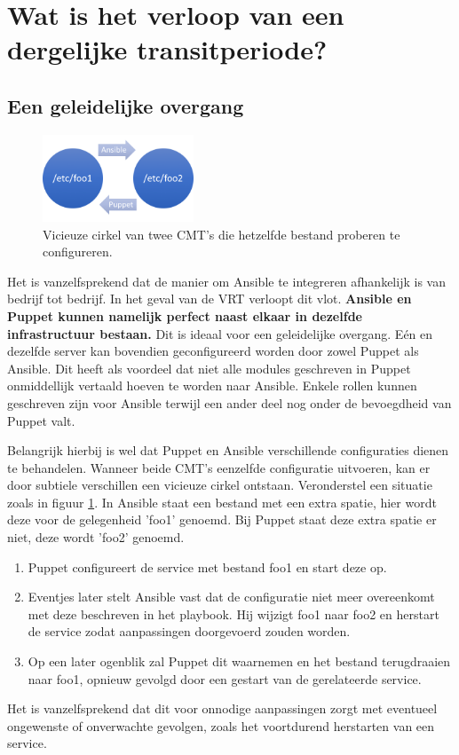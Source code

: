 \section{Wat is het verloop van een dergelijke transitperiode?}
\label{sec:methodologie-verloop-transit}
\subsection{Een geleidelijke overgang}


\begin{figure}
\centering
\includegraphics[width=0.4\textwidth]{img/vicieuzecirkel.PNG}
\caption{\label{fig:vicieuzecirkel}Vicieuze cirkel van twee \gls{CMT}'s die hetzelfde bestand proberen te configureren.}
\end{figure}

Het is vanzelfsprekend dat de manier om Ansible te integreren afhankelijk is van bedrijf tot bedrijf. In het geval van de VRT verloopt dit vlot. \textbf{Ansible en Puppet kunnen namelijk perfect naast elkaar in dezelfde infrastructuur bestaan.} Dit is ideaal voor een geleidelijke overgang. E\'en en dezelfde server kan bovendien geconfigureerd worden door zowel Puppet als Ansible. Dit heeft als voordeel dat niet alle modules geschreven in Puppet onmiddellijk vertaald hoeven te worden naar Ansible. Enkele rollen kunnen geschreven zijn voor Ansible terwijl een ander deel nog onder de bevoegdheid van Puppet valt.

 Belangrijk hierbij is wel dat Puppet en Ansible verschillende configuraties dienen te behandelen. Wanneer beide \gls{CMT}'s eenzelfde configuratie uitvoeren, kan er door subtiele verschillen een vicieuze cirkel ontstaan.
Veronderstel een situatie zoals in figuur \ref{fig:vicieuzecirkel}. In Ansible staat een bestand met een extra spatie, hier wordt deze voor de gelegenheid 'foo1' genoemd. Bij Puppet staat deze extra spatie er niet, deze wordt 'foo2' genoemd. 
\begin{enumerate}
\item Puppet configureert de service met bestand foo1 en start deze op.
\item  Eventjes later stelt Ansible vast dat de configuratie niet meer overeenkomt met deze beschreven in het playbook. Hij wijzigt foo1 naar foo2 en herstart de service zodat aanpassingen doorgevoerd zouden worden.
\item  Op een later ogenblik zal Puppet dit waarnemen en het bestand terugdraaien naar foo1, opnieuw gevolgd door een gestart van de gerelateerde service.
\end{enumerate}
Het is vanzelfsprekend dat dit voor onnodige aanpassingen zorgt met eventueel ongewenste of onverwachte gevolgen, zoals het voortdurend herstarten van een service.

